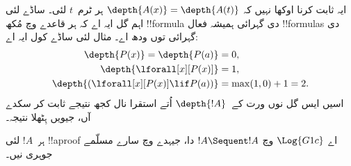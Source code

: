 \documentclass[../../../include/open-logic-section]{subfiles}
\begin{document}
ایہ ثابت کرنا اوکھا نہیں کہ $\depth{A(x)} = \depth{A(t)}$ ہر ٹرم~$t$ لئی۔ ساڈے لئی اہم گل ایہ اے کہ ہر قاعدے وچ مُکھ !!{formula} دی گہرائی ہمیشہ فعال !!{formula}s دی گہرائی توں ودھ اے۔ مثال لئی ساڈے کول ایہ اے:
\begin{align*}
\depth{P(x)} = \depth{P(a)} & = 0,\\
\depth{\lforall[x][P(x)]} & = 1,\\
\depth{(\lforall[x][P(x)] \lif P(a))} & = \max(1,0) + 1 = 2.
\end{align*}
اسیں ایس گل نوں ورت کے~$\depth{!A}$ اُتے استقرا نال کجھ نتیجے ثابت کر سکدے آں، جیویں ہِٹھلا نتیجہ۔

\begin{prop}
ہر~$!A$ لئی !!a{proof} اے $\Log{G1c}$ وچ $!A \Sequent !A$ دا، جیہدے وچ سارے مسلّمے جوہری نیں۔
\end{prop}
\end{document}
